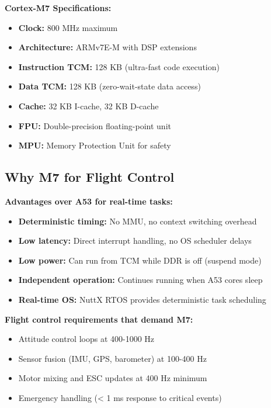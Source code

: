 \documentclass[12pt,a4paper]{report}
\begin{document}
\begin{hardware}
\textbf{Cortex-M7 Specifications:}
\begin{itemize}
    \item \textbf{Clock:} 800 MHz maximum
    \item \textbf{Architecture:} ARMv7E-M with DSP extensions
    \item \textbf{Instruction TCM:} 128 KB (ultra-fast code execution)
    \item \textbf{Data TCM:} 128 KB (zero-wait-state data access)
    \item \textbf{Cache:} 32 KB I-cache, 32 KB D-cache
    \item \textbf{FPU:} Double-precision floating-point unit
    \item \textbf{MPU:} Memory Protection Unit for safety
\end{itemize}
\end{hardware}

\subsection{Why M7 for Flight Control}

\textbf{Advantages over A53 for real-time tasks:}
\begin{itemize}
    \item \textbf{Deterministic timing:} No MMU, no context switching overhead
    \item \textbf{Low latency:} Direct interrupt handling, no OS scheduler delays
    \item \textbf{Low power:} Can run from TCM while DDR is off (suspend mode)
    \item \textbf{Independent operation:} Continues running when A53 cores sleep
    \item \textbf{Real-time OS:} NuttX RTOS provides deterministic task scheduling
\end{itemize}

\textbf{Flight control requirements that demand M7:}
\begin{itemize}
    \item Attitude control loops at 400-1000 Hz
    \item Sensor fusion (IMU, GPS, barometer) at 100-400 Hz
    \item Motor mixing and ESC updates at 400 Hz minimum
    \item Emergency handling (< 1 ms response to critical events)
\end{itemize}
\end{document}
